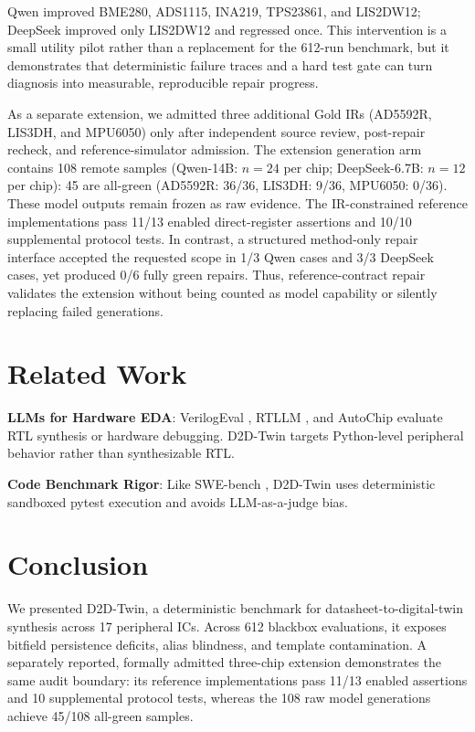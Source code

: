 \documentclass[conference]{IEEEtran}
\begin{document}
Qwen improved BME280, ADS1115, INA219, TPS23861, and LIS2DW12; DeepSeek improved only LIS2DW12 and regressed once. This intervention is a small utility pilot rather than a replacement for the 612-run benchmark, but it demonstrates that deterministic failure traces and a hard test gate can turn diagnosis into measurable, reproducible repair progress.

As a separate extension, we admitted three additional Gold IRs (AD5592R, LIS3DH, and MPU6050) only after independent source review, post-repair recheck, and reference-simulator admission. The extension generation arm contains 108 remote samples (Qwen-14B: $n=24$ per chip; DeepSeek-6.7B: $n=12$ per chip): 45 are all-green (AD5592R: 36/36, LIS3DH: 9/36, MPU6050: 0/36). These model outputs remain frozen as raw evidence. The IR-constrained reference implementations pass 11/13 enabled direct-register assertions and 10/10 supplemental protocol tests. In contrast, a structured method-only repair interface accepted the requested scope in 1/3 Qwen cases and 3/3 DeepSeek cases, yet produced 0/6 fully green repairs. Thus, reference-contract repair validates the extension without being counted as model capability or silently replacing failed generations.

\section{Related Work}
\textbf{LLMs for Hardware EDA}: VerilogEval \cite{thakur2023verilogeval}, RTLLM \cite{lu2024rtllm}, and AutoChip \cite{blocklove2023chip} evaluate RTL synthesis or hardware debugging. D2D-Twin targets Python-level peripheral behavior rather than synthesizable RTL.

\textbf{Code Benchmark Rigor}: Like SWE-bench \cite{jimenez2024swebench}, D2D-Twin uses deterministic sandboxed pytest execution and avoids LLM-as-a-judge bias.

\section{Conclusion}
We presented D2D-Twin, a deterministic benchmark for datasheet-to-digital-twin synthesis across 17 peripheral ICs. Across 612 blackbox evaluations, it exposes bitfield persistence deficits, alias blindness, and template contamination. A separately reported, formally admitted three-chip extension demonstrates the same audit boundary: its reference implementations pass 11/13 enabled assertions and 10 supplemental protocol tests, whereas the 108 raw model generations achieve 45/108 all-green samples.
\end{document}
